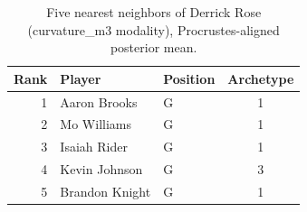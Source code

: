 \begin{table}[htbp]
  \centering\small
  \begin{tabular}{rllc}
    \toprule
    Rank & Player & Position & Archetype \\
    \midrule
    1 & Aaron Brooks & G & 1 \\
    2 & Mo Williams & G & 1 \\
    3 & Isaiah Rider & G & 1 \\
    4 & Kevin Johnson & G & 3 \\
    5 & Brandon Knight & G & 1 \\
    \bottomrule
  \end{tabular}
  \caption{Five nearest neighbors of Derrick Rose (curvature_m3 modality), Procrustes-aligned posterior mean.}
  \label{tab:Derrick_Rose_neighbors_curvature_m3}
\end{table}

